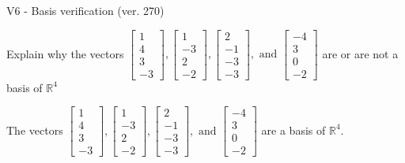 \begin{exercise}
  \begin{exerciseTitle}V6 - Basis verification (ver. 270)\end{exerciseTitle}
  \begin{exerciseStatement}
    Explain why the vectors \(\left[\begin{array}{r}
1 \\
4 \\
3 \\
-3
\end{array}\right] , \left[\begin{array}{r}
1 \\
-3 \\
2 \\
-2
\end{array}\right] , \left[\begin{array}{r}
2 \\
-1 \\
-3 \\
-3
\end{array}\right] , \text{ and } \left[\begin{array}{r}
-4 \\
3 \\
0 \\
-2
\end{array}\right]\) are or are not a basis of \(\mathbb{R}^4\)	


  \end{exerciseStatement}
  \begin{exerciseAnswer}
   The vectors \(\left[\begin{array}{r}
1 \\
4 \\
3 \\
-3
\end{array}\right] , \left[\begin{array}{r}
1 \\
-3 \\
2 \\
-2
\end{array}\right] , \left[\begin{array}{r}
2 \\
-1 \\
-3 \\
-3
\end{array}\right] , \text{ and } \left[\begin{array}{r}
-4 \\
3 \\
0 \\
-2
\end{array}\right]\) 
  	 are  a basis of \(\mathbb{R}^4\).
  


  \end{exerciseAnswer}
\end{exercise}